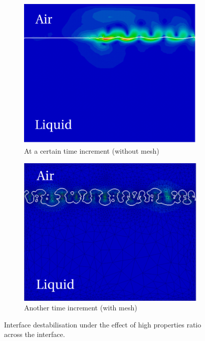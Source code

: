 \begin{figure}[htbp]
\centering
 \begin{subfigure}[t]{0.4\textwidth}
    \centering
	\includegraphics[width=\textwidth]{Chapter5/Graphics/UnstableInterface1.pdf}
	\caption{At a certain time increment (without mesh)}
    \label{fig:UnstableInterface1}
  \end{subfigure}
\qquad
 \begin{subfigure}[t]{0.4\textwidth}
    \centering
	\includegraphics[width=\textwidth]{Chapter5/Graphics/UnstableInterface2.pdf}
	\caption{Another time increment (with mesh)}
    \label{fig:UnstableInterface2}
  \end{subfigure}
\caption{Interface destabilisation under the effect of high properties ratio across the interface.}
\end{figure}

